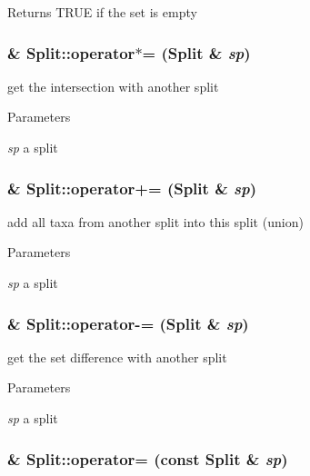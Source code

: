 \label{classSplit_abb9262185c7f5bf5b9f6604c432a796f}
\begin{DoxyReturn}{Returns}
TRUE if the set is empty 
\end{DoxyReturn}
\hypertarget{classSplit_ac9be6ec283224b571f14353f348b251e}{
\subsubsection[{operator$\ast$=}]{ \& Split::operator$\ast$= ({\bf Split} \& {\em sp})}}
\label{classSplit_ac9be6ec283224b571f14353f348b251e}
get the intersection with another split 
\begin{DoxyParams}{Parameters}
\item[{\em sp}]a split \end{DoxyParams}
\hypertarget{classSplit_a553102b9ea76d19445a4071b822d17b0}{
\subsubsection[{operator+=}]{ \& Split::operator+= ({\bf Split} \& {\em sp})}}
\label{classSplit_a553102b9ea76d19445a4071b822d17b0}
add all taxa from another split into this split (union) 
\begin{DoxyParams}{Parameters}
\item[{\em sp}]a split \end{DoxyParams}
\hypertarget{classSplit_a510547abdad1acc043c104810a936fa8}{
\subsubsection[{operator-\/=}]{ \& Split::operator-\/= ({\bf Split} \& {\em sp})}}
\label{classSplit_a510547abdad1acc043c104810a936fa8}
get the set difference with another split 
\begin{DoxyParams}{Parameters}
\item[{\em sp}]a split \end{DoxyParams}
\hypertarget{classSplit_ab8d66a1714b54f7e1a1a0c714b2e1175}{
\subsubsection[{operator=}]{ \& Split::operator= (const {\bf Split} \& {\em sp})}}
